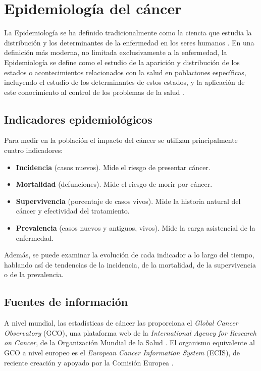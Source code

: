 \chapter{Epidemiología del cáncer}

La Epidemiología se ha definido tradicionalmente como la ciencia que estudia la distribución y los determinantes de la enfermedad en los seres humanos \cite{MacMahon1970}. En una definición más moderna, no limitada exclusivamente a la enfermedad, la Epidemiología se define como el estudio de la aparición y distribución de los estados o acontecimientos relacionados con la salud en poblaciones específicas, incluyendo el estudio de los determinantes de estos estados, y la aplicación de este conocimiento al control de los problemas de la salud \cite{Porta2008}.

\section{Indicadores epidemiológicos}

Para medir en la población el impacto del cáncer se utilizan principalmente cuatro indicadores:

\begin{itemize}
	\item \textbf{Incidencia} (casos nuevos). Mide el riesgo de presentar cáncer.
	\item \textbf{Mortalidad} (defunciones). Mide el riesgo de morir por cáncer.
	\item \textbf{Supervivencia} (porcentaje de casos vivos). Mide la historia natural del cáncer y efectividad del tratamiento.
	\item \textbf{Prevalencia} (casos nuevos y antiguos, vivos). Mide la carga asistencial de la enfermedad.
\end{itemize}

Además, se puede examinar la evolución de cada indicador a lo largo del tiempo, hablando así de tendencias de la incidencia, de la mortalidad, de la supervivencia o de la prevalencia.\\


\section{Fuentes de información}

A nivel mundial, las estadísticas de cáncer las proporciona el \textit{Global Cancer Observatory} (GCO), una plataforma web de la \textit{International Agency for Research on Cancer}, de la Organización Mundial de la Salud \cite{Bray2018, GCO}. El organismo equivalente al GCO a nivel europeo es el \textit{European Cancer Information System} (ECIS), de reciente creación y apoyado por la Comisión Europea \cite{ECIS, ECIS2}.\\

